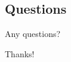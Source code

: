 \documentclass[utf8]{beamer}
\begin{document}
\subsection{Questions}
\begin{frame}
	\alert{Any questions?}
\end{frame}

\appendix

\begin{frame}
	\begin{center}
		{\Huge Thanks!}
	\end{center}
\end{frame}
\end{document}
